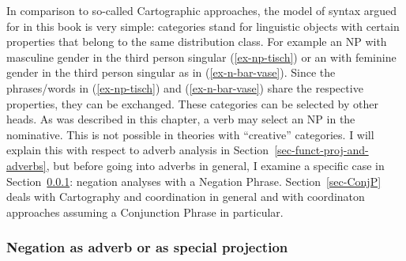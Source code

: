 In comparison to so-called Cartographic approaches, the model of syntax argued for in this book is very simple: categories stand for linguistic objects
with certain properties that belong to the same distribution class. For example an NP with masculine
gender in the third person singular (\ref{ex-np-tisch}) or an \nbar with feminine gender in the third person
singular as in (\ref{ex-n-bar-vase}). Since the phrases/words in (\ref{ex-np-tisch}) and
(\ref{ex-n-bar-vase}) share the respective properties, they can be exchanged. These categories can be
selected by other heads. As was described in this chapter, a verb may select an NP in the
nominative. This is not possible in theories with ``creative'' categories. I will explain this with
respect to  adverb analysis in Section~\ref{sec-funct-proj-and-adverbs}, but
before going into adverbs in general, I examine a specific case in Section~\ref{sec-NegP}: negation
analyses with a Negation Phrase. Section~\ref{sec-ConjP} deals with Cartography and coordination in
general and with coordinaton approaches assuming a Conjunction Phrase in particular.


\subsubsection{Negation as adverb or as special projection}
\label{sec-NegP}

